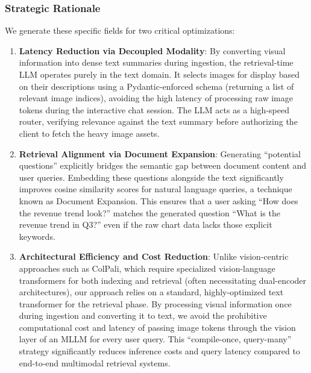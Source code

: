 \documentclass[conference]{IEEEtran}
\begin{document}
\subsubsection{Strategic Rationale}
We generate these specific fields for two critical optimizations:
\begin{enumerate}
    \item \textbf{Latency Reduction via Decoupled Modality}: By converting visual information into dense text summaries during ingestion, the retrieval-time LLM operates purely in the text domain. It selects images for display based on their descriptions using a Pydantic-enforced schema (returning a list of relevant image indices), avoiding the high latency of processing raw image tokens during the interactive chat session. The LLM acts as a high-speed router, verifying relevance against the text summary before authorizing the client to fetch the heavy image assets.
    \item \textbf{Retrieval Alignment via Document Expansion}: Generating ``potential questions'' explicitly bridges the semantic gap between document content and user queries. Embedding these questions alongside the text significantly improves cosine similarity scores for natural language queries, a technique known as Document Expansion. This ensures that a user asking ``How does the revenue trend look?'' matches the generated question ``What is the revenue trend in Q3?'' even if the raw chart data lacks those explicit keywords.
    \item \textbf{Architectural Efficiency and Cost Reduction}: Unlike vision-centric approaches such as ColPali, which require specialized vision-language transformers for both indexing and retrieval (often necessitating dual-encoder architectures), our approach relies on a standard, highly-optimized text transformer for the retrieval phase. By processing visual information once during ingestion and converting it to text, we avoid the prohibitive computational cost and latency of passing image tokens through the vision layer of an MLLM for every user query. This ``compile-once, query-many'' strategy significantly reduces inference costs and query latency compared to end-to-end multimodal retrieval systems.
\end{enumerate}
\end{document}
